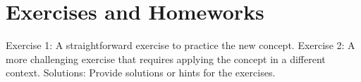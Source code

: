 \section{Exercises and Homeworks}
Exercise 1: A straightforward exercise to practice the new concept.
Exercise 2: A more challenging exercise that requires applying the concept in a different context.
Solutions: Provide solutions or hints for the exercises.